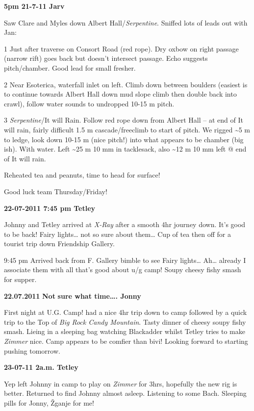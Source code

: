 \textbf{5pm 21-7-11 Jarv}

Saw Clare and Myles down Albert Hall/\emph{Serpentine}. Sniffed lots of
leads out with Jan:

1 Just after traverse on Consort Road (red rope). Dry oxbow on right
passage (narrow rift) goes back but doesn't intersect passage. Echo
suggests pitch/chamber. Good lead for small fresher.

2 Near Esoterica, waterfall inlet on left. Climb down between boulders
(easiest is to continue towards Albert Hall down mud slope climb then
double back into crawl), follow water sounds to undropped 10-15 m pitch.

3 \emph{Serpentine}/It will Rain. Follow red rope down from Albert Hall
-- at end of It will rain, fairly difficult 1.5 m cascade/freeclimb to
start of pitch. We rigged \textasciitilde 5 m to ledge, look down 10-15
m (nice pitch!) into what appears to be chamber (big ish). With water.
Left \textasciitilde 25 m 10 mm in tacklesack, also \textasciitilde 12 m
10 mm left @ end of It will rain.

Reheated tea and peanuts, time to head for surface!

Good luck team Thursday/Friday!

\textbf{22-07-2011 7:45 pm Tetley}

Johnny and Tetley arrived at \emph{X-Ray} after a smooth 4hr journey
down. It's good to be back! Fairy lights\ldots{} not so sure about
them\ldots{} Cup of tea then off for a tourist trip down Friendship
Gallery.

9:45 pm Arrived back from F. Gallery bimble to see Fairy lights\ldots{}
Ah\ldots{} already I associate them with all that's good about u/g camp!
Soupy cheesy fishy smash for supper.

\textbf{22.07.2011} \textbf{Not} \textbf{sure what time\ldots{}. Jonny}

First night at U.G. Camp! had a nice 4hr trip down to camp followed by a
quick trip to the Top of \emph{Big Rock Candy Mountain}. Tasty dinner of
cheesy soupy fishy smash. Lieing in a sleeping bag watching Blackadder
whilst Tetley tries to make \emph{Zimmer} nice. Camp appears to be
comfier than bivi! Looking forward to starting pushing tomorrow.

\textbf{23-07-11 2a.m. Tetley}

Yep left Johnny in camp to play on \emph{Zimmer} for 3hrs, hopefully the
new rig is better. Returned to find Johnny almost asleep. Listening to
some Bach. Sleeping pills for Jonny, Žganje for me!


